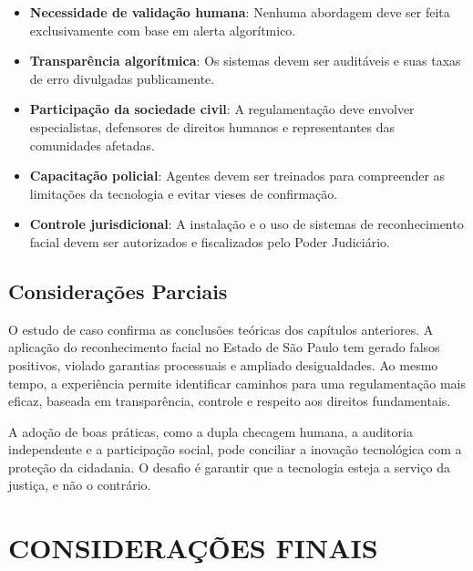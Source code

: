 \documentclass[12pt,a4paper]{article}
\begin{document}
\begin{itemize}
    \item \textbf{Necessidade de validação humana}: Nenhuma abordagem deve ser feita exclusivamente com base em alerta algorítmico.
    
    \item \textbf{Transparência algorítmica}: Os sistemas devem ser auditáveis e suas taxas de erro divulgadas publicamente.
    
    \item \textbf{Participação da sociedade civil}: A regulamentação deve envolver especialistas, defensores de direitos humanos e representantes das comunidades afetadas.
    
    \item \textbf{Capacitação policial}: Agentes devem ser treinados para compreender as limitações da tecnologia e evitar vieses de confirmação.
    
    \item \textbf{Controle jurisdicional}: A instalação e o uso de sistemas de reconhecimento facial devem ser autorizados e fiscalizados pelo Poder Judiciário.
\end{itemize}

\subsection{Considerações Parciais}

O estudo de caso confirma as conclusões teóricas dos capítulos anteriores. A aplicação do reconhecimento facial no Estado de São Paulo tem gerado falsos positivos, violado garantias processuais e ampliado desigualdades. Ao mesmo tempo, a experiência permite identificar caminhos para uma regulamentação mais eficaz, baseada em transparência, controle e respeito aos direitos fundamentais.

A adoção de boas práticas, como a dupla checagem humana, a auditoria independente e a participação social, pode conciliar a inovação tecnológica com a proteção da cidadania. O desafio é garantir que a tecnologia esteja a serviço da justiça, e não o contrário.

\section*{CONSIDERAÇÕES FINAIS}
\end{document}
